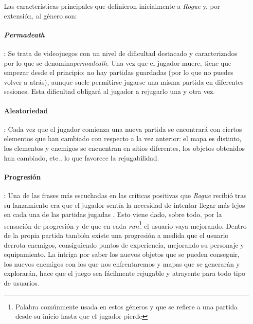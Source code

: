 Las características principales que definieron inicialmente a \textit{Rogue} y, por extensión, al género son:

\paragraph{\textit{Permadeath}}: Se trata de videojuegos con un nivel de dificultad destacado y caracterizados por lo que se denomina\textit{permadeath}. Una vez que el jugador muere, tiene que empezar desde el principio; no hay partidas guardadas (por lo que no puedes volver a atrás), aunque suele permitirse jugarse una misma partida en diferentes sesiones. Esta dificultad obligará al jugador a rejugarlo una y otra vez.

\paragraph{Aleatoriedad}: Cada vez que el jugador comienza una nueva partida se encontrará con ciertos elementos que han cambiado con respecto a la vez anterior: el mapa es distinto, los elementos y enemigos se encuentran en sitios diferentes, los objetos obtenidos han cambiado, etc., lo que favorece la rejugabilidad.

\paragraph{Progresión}: Una de las frases más escuchadas en las críticas positivas que \textit{Rogue} recibió tras su lanzamiento era que el jugador sentía la necesidad de intentar llegar más lejos en cada una de las partidas jugadas \cite{website:machinesnetworks}. Esto viene dado, sobre todo, por la sensación de progresión y de que en cada \textit{run}\footnote{Palabra comúnmente usada en estos géneros y que se refiere a una partida desde su inicio hasta que el jugador pierde} el usuario vaya mejorando. Dentro de la propia partida también existe una progresión a medida que el usuario derrota enemigos, consiguiendo puntos de experiencia, mejorando su personaje y equipamiento. La intriga por saber los nuevos objetos que se pueden conseguir, los nuevos enemigos con los que nos enfrentaremos y mapas que se generarán y explorarán, hace que el juego sea fácilmente rejugable y atrayente para todo tipo de usuarios.

